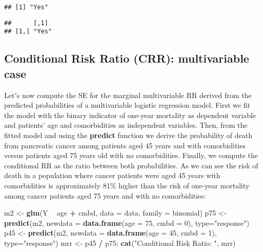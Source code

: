 \documentclass[]{article}
\newenvironment{Shaded}{\begin{snugshade}}{\end{snugshade}}
\newcommand{\DataTypeTok}[1]{\textcolor[rgb]{0.13,0.29,0.53}{#1}}
\newcommand{\DecValTok}[1]{\textcolor[rgb]{0.00,0.00,0.81}{#1}}
\newcommand{\KeywordTok}[1]{\textcolor[rgb]{0.13,0.29,0.53}{\textbf{#1}}}
\newcommand{\NormalTok}[1]{#1}
\newcommand{\OperatorTok}[1]{\textcolor[rgb]{0.81,0.36,0.00}{\textbf{#1}}}
\newcommand{\StringTok}[1]{\textcolor[rgb]{0.31,0.60,0.02}{#1}}
\begin{document}
\begin{verbatim}
## [1] "Yes"
\end{verbatim}

\begin{verbatim}
##      [,1] 
## [1,] "Yes"
\end{verbatim}

\hypertarget{conditional-risk-ratio-crr-multivariable-case}{%
\subsection{Conditional Risk Ratio (CRR): multivariable
case}\label{conditional-risk-ratio-crr-multivariable-case}}

Let\('\)s now compute the SE for the marginal multivariable RR derived
from the predicted probabilities of a multivariable logistic regression
model. First we fit the model with the binary indicator of one-year
mortality as dependent variable and patients\(’\) age and comorbidities
as independent variables. Then, from the fitted model and using the
\textbf{predict} function we derive the probability of death from
pancreatic cancer among patients aged 45 years and with comorbidities
versus patients aged 75 years old with no comorbidities. Finally, we
compute the conditional RR as the ratio between both probabilities. As
we can see the risk of death in a population where cancer patients were
aged 45 years with comorbidities is approximately 81\% higher than the
risk of one-year mortality among cancer patients aged 75 years and with
no comorbidities:

\begin{Shaded}
\begin{Highlighting}[]
\NormalTok{m2 <-}\StringTok{ }\KeywordTok{glm}\NormalTok{(Y }\OperatorTok{~}\StringTok{ }\NormalTok{age }\OperatorTok{+}\StringTok{ }\NormalTok{cmbd, }\DataTypeTok{data =}\NormalTok{ data, }\DataTypeTok{family =}\NormalTok{ binomial)}
\NormalTok{p75 <-}\StringTok{ }\KeywordTok{predict}\NormalTok{(m2, }\DataTypeTok{newdata =} \KeywordTok{data.frame}\NormalTok{(}\DataTypeTok{age =} \DecValTok{75}\NormalTok{, }\DataTypeTok{cmbd =} \DecValTok{0}\NormalTok{), }\DataTypeTok{type=}\StringTok{"response"}\NormalTok{)}
\NormalTok{p45 <-}\StringTok{ }\KeywordTok{predict}\NormalTok{(m2, }\DataTypeTok{newdata =} \KeywordTok{data.frame}\NormalTok{(}\DataTypeTok{age =} \DecValTok{45}\NormalTok{, }\DataTypeTok{cmbd =} \DecValTok{1}\NormalTok{), }\DataTypeTok{type=}\StringTok{"response"}\NormalTok{)}
\NormalTok{mrr <-}\StringTok{ }\NormalTok{p45 }\OperatorTok{/}\StringTok{ }\NormalTok{p75;}
\KeywordTok{cat}\NormalTok{(}\StringTok{"Conditional Risk Ratio: "}\NormalTok{, mrr)}
\end{Highlighting}
\end{Shaded}
\end{document}
